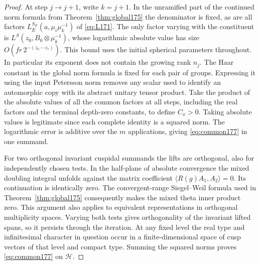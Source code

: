 \documentclass[a4paper,11pt]{article}
\theoremstyle{definition}
\theoremstyle{remark}
\numberwithin{equation}{section}
\begin{document}
\begin{proof}
At step \(j\to j+1\), write \(k=j+1\). In the unramified
part of the continued norm formula from
Theorem~\ref{thm:global175} the denominator is fixed, as are
all factors \(L_E^{S_E}(a,\mu_i\mu_k^{-1})\) of
\eqref{eq:L171}. The only factor varying with the
constituent is \(L^S(z_0,B_0\otimes\mu_k^{-1})\),
whose logarithmic absolute value has size
\(O(fr\,2^{-(z_0-c_r)})\). This bound uses the initial
spherical parameters throughout. In particular its exponent
does not contain the growing rank \(n_j\). The Haar
constant in the global norm formula is fixed for each pair
of groups. Expressing it using the input Petersson norm
removes any scalar used to identify an automorphic copy
with its abstract unitary tensor product. Take the product
of the absolute values of all the common factors at all
steps, including the real factors and the terminal
depth-zero constants, to define \(C_x>0\).
Taking absolute values is legitimate since each complete
identity is a squared norm. The logarithmic error is
additive over the \(m\) applications, giving \eqref{eq:common177}
in one summand.

For two orthogonal invariant cuspidal summands the lifts
are orthogonal, also for independently chosen tests. In the
half-plane of absolute convergence the mixed doubling
integral unfolds against the matrix coefficient
\(\langle R(g)A_1,A_2\rangle=0\). Its continuation is
identically zero. The convergent-range Siegel--Weil
formula used in Theorem~\ref{thm:global175} consequently
makes the mixed theta inner product zero. This argument
also applies to equivalent representations in orthogonal
multiplicity spaces. Varying both tests gives orthogonality
of the invariant lifted spans, so it persists through the
iteration. At any fixed level the real type and infinitesimal
character in question occur in a finite-dimensional space
of cusp vectors of that level and compact type. Summing
the squared norms proves \eqref{eq:common177} on \(\mathcal H\).
\end{proof}
\end{document}
